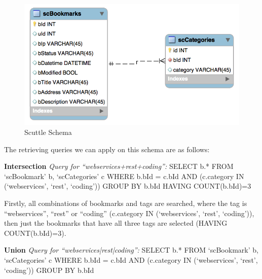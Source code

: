 \begin{figure}[!h]
\begin{centering}
\includegraphics[scale=0.5]{pics/scuttle}
\caption{Scuttle Schema}\label{fg:scuttle}
\end{centering}
\end{figure}

The retrieving queries we can apply on this schema are as follows:

\textbf{Intersection}\newline
\textit{Query for ``webservices+rest+coding'':}\newline\newline
SELECT b.*\newline
FROM `scBookmark' b, `scCategories' c\newline
WHERE b.bId = c.bId\newline
AND (c.category IN (`webservices', `rest', `coding'))\newline
GROUP BY b.bId\newline
HAVING COUNT(b.bId)=3

Firstly, all combinations of bookmarks and tags are searched, where the tag is ``webservices'', ``rest'' or ``coding'' (c.category IN (`webservices', `rest', `coding')), then just the bookmarks that have all three tags are selected (HAVING COUNT(b.bId)=3).

\textbf{Union}\newline
\textit{Query for ``webservices|rest|coding'':}\newline\newline
SELECT b.*\newline
FROM `scBookmark' b, `scCategories' c\newline
WHERE b.bId = c.bId\newline
AND (c.category IN (`webservices', `rest', `coding'))\newline
GROUP BY b.bId

